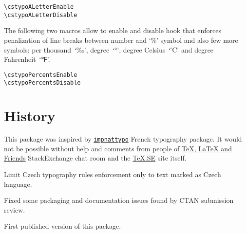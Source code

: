 \documentclass[paper=B5,DIV=calc,parskip=half]{scrartcl}
\begin{document}
\begin{lstlisting}[style=myLatexStyle]
\cstypoALetterEnable
\cstypoALetterDisable
\end{lstlisting}

The following two macros allow to enable and disable hook that enforces
penalization of line breaks between number and \enquote*{\%} symbol and also
few more symbols: per thousand~\enquote*{‰}, degree~\enquote*{°}, degree
Celsius~\enquote*{℃} and degree Fahrenheit~\enquote*{℉}.

\begin{lstlisting}[style=myLatexStyle]
\cstypoPercentsEnable
\cstypoPercentsDisable
\end{lstlisting}


\section{History}

This package was inspired by
\texttt{\href{http://www.ctan.org/pkg/impnattypo}{impnattypo}} French
typography package. It would not be possible without help and comments from
people of
\href{http://chat.stackexchange.com/rooms/41/tex-latex-and-friends}{\TeX{},
  \LaTeX{} and Friends} StackExchange chat room and the
\href{http://tex.stackexchange.com/}{\TeX.SE} site itself.

\begin{description}[style=nextline, labelwidth=4.5em, leftmargin=!, labelindent=0em]
\item[\texttt{v0.03}] Limit Czech typography rules enforcement only to text
  marked as Czech language.
\item[\texttt{v0.02}] Fixed some packaging and documentation issues found by
  CTAN submission review.
\item[\texttt{v0.01}] First published version of this package.
\end{description}
\end{document}
